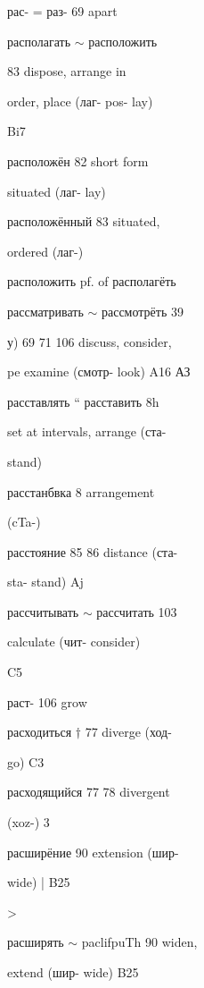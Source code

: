 \begin{minipage}[t]{0.475\textwidth}
\raggedright
\noindent рас- = раз- 69 apart\par
\noindent располагать $\sim$ расположить\par
{} 83 dispose, arrange in\par
\noindent order, place (лаг- pos- lay)\par
\noindent Bi7\par
{} расположён 82 short form\par
\noindent situated (лаг- lay)\par
\noindent расположённый 83 situated,\par
\noindent ordered (лаг-)\par
\noindent расположить pf. of располагёть\par
\noindent рассматривать $\sim$ рассмотрёть 39\par
\noindent у) 69 71 106 discuss, consider,\par
\noindent pe examine (смотр- look) A16 АЗ\par
\noindent расставлять “ расставить 8h\par
\noindent set at intervals, arrange (ста-\par
\noindent stand)\par
\noindent расстанбвка 8 arrangement\par
\noindent (cTa-)\par
\noindent расстояние 85 86 distance (ста-\par
\noindent sta- stand) Aj\par
\noindent рассчитывать $\sim$ рассчитать 103\par
{} calculate (чит- consider)\par
\noindent C5\par
\noindent раст- 106 grow\par
\noindent расходиться $\dagger$ 77 diverge (ход-\par
\noindent go) C3\par
\noindent расходящийся 77 78 divergent\par
\noindent (xoz-) 3\par
\noindent расширёние 90 extension (шир-\par
\noindent wide) | B25\par
\noindent >\par
\noindent расширять $\sim$ paclifpuTh 90 widen,\par
\noindent extend (шир- wide) B25\par

\end{minipage}
